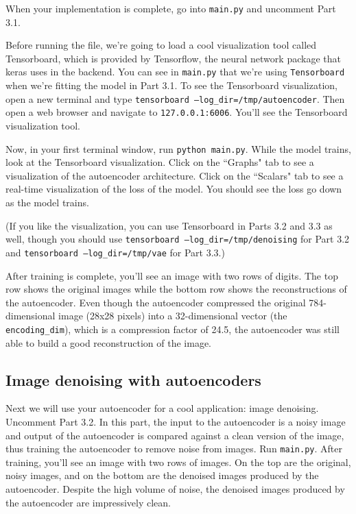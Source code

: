 \documentclass{article}
\begin{document}
When your implementation is complete, go into \texttt{main.py} and uncomment Part 3.1.

Before running the file, we're going to load a cool visualization tool called Tensorboard, which is provided by Tensorflow, the neural network package that keras uses in the backend. You can see in \texttt{main.py} that we're using \texttt{Tensorboard} when we're fitting the model in Part 3.1. To see the Tensorboard visualization, open a new terminal and type \texttt{tensorboard --log\_dir=/tmp/autoencoder}. Then open a web browser and navigate to \texttt{127.0.0.1:6006}. You'll see the Tensorboard visualization tool.

Now, in your first terminal window, run \texttt{python main.py}. While the model trains, look at the Tensorboard visualization. Click on the ``Graphs" tab to see a visualization of the autoencoder architecture. Click on the ``Scalars" tab to see a real-time visualization of the loss of the model. You should see the loss go down as the model trains.

(If you like the visualization, you can use Tensorboard in Parts 3.2 and 3.3 as well, though you should use \texttt{tensorboard --log\_dir=/tmp/denoising} for Part 3.2 and \texttt{tensorboard --log\_dir=/tmp/vae} for Part 3.3.)

After training is complete, you'll see an image with two rows of digits. The top row shows the original images while the bottom row shows the reconstructions of the autoencoder. Even though the autoencoder compressed the original 784-dimensional image (28x28 pixels) into a 32-dimensional vector (the \texttt{encoding\_dim}), which is a compression factor of 24.5, the autoencoder was still able to build a good reconstruction of the image.

\subsection{Image denoising with autoencoders}

Next we will use your autoencoder for a cool application: image denoising. Uncomment Part 3.2. In this part, the input to the autoencoder is a noisy image and output of the autoencoder is compared against a clean version of the image, thus training the autoencoder to remove noise from images. Run \texttt{main.py}. After training, you'll see an image with two rows of images. On the top are the original, noisy images, and on the bottom are the denoised images produced by the autoencoder. Despite the high volume of noise, the denoised images produced by the autoencoder are impressively clean.
\end{document}
